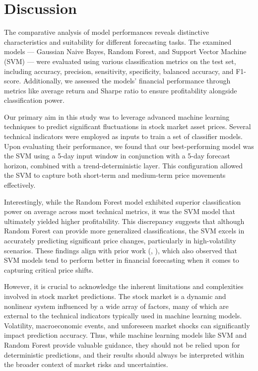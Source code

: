 \documentclass[aodsor,preprint]{imsart}
\numberwithin{equation}{section}
\theoremstyle{plain}
\begin{document}
\section{Discussion}

The comparative analysis of model performances reveals distinctive characteristics and suitability for different forecasting tasks. The examined models — Gaussian Naive Bayes, Random Forest, and Support Vector Machine (SVM) — were evaluated using various classification metrics on the test set, including accuracy, precision, sensitivity, specificity, balanced accuracy, and F1-score. Additionally, we assessed the models' financial performance through metrics like average return and Sharpe ratio to ensure profitability alongside classification power.

Our primary aim in this study was to leverage advanced machine learning techniques to predict significant fluctuations in stock market asset prices. Several technical indicators were employed as inputs to train a set of classifier models. Upon evaluating their performance, we found that our best-performing model was the SVM using a 5-day input window in conjunction with a 5-day forecast horizon, combined with a trend-deterministic layer. This configuration allowed the SVM to capture both short-term and medium-term price movements effectively. 

Interestingly, while the Random Forest model exhibited superior classification power on average across most technical metrics, it was the SVM model that ultimately yielded higher profitability. This discrepancy suggests that although Random Forest can provide more generalized classifications, the SVM excels in accurately predicting significant price changes, particularly in high-volatility scenarios. These findings align with prior work (\cite{kim2003}, \cite{patel2015}), which also observed that SVM models tend to perform better in financial forecasting when it comes to capturing critical price shifts.

However, it is crucial to acknowledge the inherent limitations and complexities involved in stock market predictions. The stock market is a dynamic and nonlinear system influenced by a wide array of factors, many of which are external to the technical indicators typically used in machine learning models. Volatility, macroeconomic events, and unforeseen market shocks can significantly impact prediction accuracy. Thus, while machine learning models like SVM and Random Forest provide valuable guidance, they should not be relied upon for deterministic predictions, and their results should always be interpreted within the broader context of market risks and uncertainties.
\end{document}

